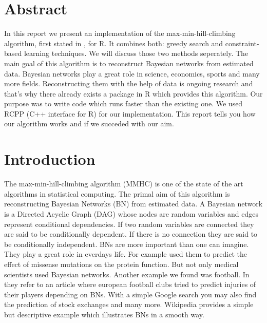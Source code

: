 \pagestyle{useheadings} 

\tableofcontents
\listoffigures

\chapter*{Abstract}

In this report we present an implementation of the max-min-hill-climbing algorithm, first stated in \cite{TBA}, for R. It combines both: greedy search and constraint-based learning techniques. We will discuss those two methods seperately. The main goal of this algorithm is to reconstruct Bayesian networks from estimated data. Bayesian networks play a great role in science, economics, sports and many more fields. Reconstructing them with the help of data is ongoing research and that's why there already exists a package in R which provides this algorithm. Our purpose was to write code which runs faster than the existing one. We used RCPP (C++ interface for R) for our implementation. This report tells you how our algorithm works and if we succeded with our aim.

\chapter{Introduction}

The max-min-hill-climbing algorithm (MMHC) is one of the state of the art algorithms in statistical computing. The primal aim of this algorithm is reconstructing Bayesian Networks (BN) from estimated data. A Bayesian network is a Directed Acyclic Graph (DAG) whose nodes are random variables and edges represent conditional dependencies. If two random variables are connected they are said to be conditionally dependent. If there is no connection they are said to be conditionally independent. BNs are more important than one can imagine. They play a great role in everdays life. For example \cite{NBBCW} used them to predict the effect of missense mutations on the protein function. But not only medical scientists used Bayesian networks. Another example we found was football. In \cite{PKA} they refer to an article where european football clubs tried to predict injuries of their players depending on BNs. With a simple Google search you may also find the prediction of stock exchanges and many more. Wikipedia provides a simple but descriptive example which illustrates BNs in a smooth way.



